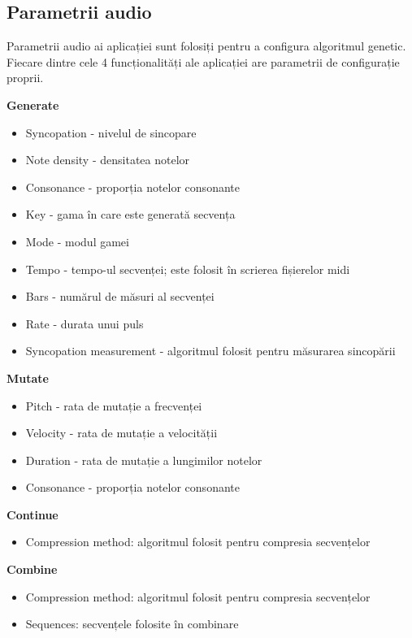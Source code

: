     \subsection{Parametrii audio}
        \noindent Parametrii audio ai aplicației sunt folosiți pentru a configura algoritmul genetic. Fiecare dintre cele 4 funcționalități ale aplicației are parametrii de configurație proprii. \par
        \noindent \textbf{Generate}
        \begin{itemize}
            \item Syncopation - nivelul de sincopare
            \item Note density - densitatea notelor
            \item Consonance - proporția notelor consonante
            \item Key - gama în care este generată secvența
            \item Mode - modul gamei
            \item Tempo - tempo-ul secvenței; este folosit în scrierea fișierelor midi
            \item Bars - numărul de măsuri al secvenței
            \item Rate - durata unui puls
            \item Syncopation measurement - algoritmul folosit pentru măsurarea sincopării 
        \end{itemize}
        \noindent \textbf{Mutate}
        \begin{itemize}
            \item Pitch - rata de mutație a frecvenței
            \item Velocity - rata de mutație a velocității
            \item Duration - rata de mutație a lungimilor notelor
            \item Consonance - proporția notelor consonante
        \end{itemize}
        \noindent \textbf{Continue}
        \begin{itemize}
            \item Compression method: algoritmul folosit pentru compresia secvențelor
        \end{itemize}
        \noindent \textbf{Combine}
        \begin{itemize}
            \item Compression method: algoritmul folosit pentru compresia secvențelor
            \item Sequences: secvențele folosite în combinare
        \end{itemize}